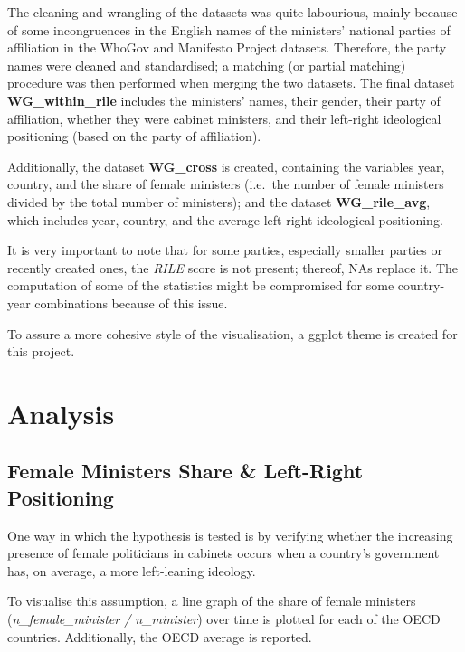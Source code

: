 \documentclass[12pt,letterpaper]{article}
\begin{document}
\noindent The cleaning and wrangling of the datasets was quite labourious, mainly because of some incongruences in the English names of the ministers' national parties of affiliation in the WhoGov and Manifesto Project datasets. Therefore, the party names were cleaned and standardised; a matching (or partial matching) procedure was then performed when merging the two datasets. The final dataset \textbf{WG\_within\_rile} includes the ministers’ names, their gender, their party of affiliation, whether they were cabinet ministers, and their left-right ideological positioning (based on the party of affiliation).  

\noindent Additionally, the dataset \textbf{WG\_cross} is created, containing the variables year, country, and the share of female ministers (i.e.\ the number of female ministers divided by the total number of ministers); and the dataset \textbf{WG\_rile\_avg}, which includes year, country, and the average left-right ideological positioning. 

\noindent It is very important to note that for some parties, especially smaller parties or recently created ones, the \emph{RILE} score is not present; thereof, NAs replace it. The computation of some of the statistics might be compromised for some country-year combinations because of this issue. 


\vspace{0.5cm}
\noindent To assure a more cohesive style of the visualisation, a ggplot theme is created for this project.
\vspace{0.5cm}



	\section{Analysis}
		\subsection{Female Ministers Share \& Left-Right Positioning}
		
\vspace{0.5cm}
\noindent One way in which the hypothesis is tested is by verifying whether the increasing presence of female politicians in cabinets occurs when a country’s government has, on average, a more left-leaning ideology. 

\noindent To visualise this assumption, a line graph of the share of female ministers (\emph{n\_female\_minister / n\_minister}) over time is plotted for each of the OECD countries. Additionally, the OECD average is reported. 
\end{document}
